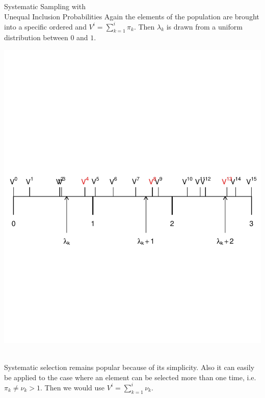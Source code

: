 \documentclass[10pt]{beamer}\usepackage[]{graphicx}\usepackage[]{color}
\newenvironment{knitrout}{}{} %
\begin{document}
\begin{frame}{Systematic Sampling with \\ Unequal Inclusion Probabilities}
Again the elements of the population are brought into a specific ordered and $V^i = \sum_{k=1}^i \pi_k$. Then $\lambda_k$ is drawn from a uniform distribution between $0$ and $1$.
~\\[-4cm]
\begin{knitrout}\footnotesize
{}\color{fgcolor}

{\centering \includegraphics[width=.95\linewidth]{graphs/beamer-UP_SYS-1} 

}



\end{knitrout}
~\\[-4cm]
Systematic selection remains popular because of its simplicity. Also it can easily be applied to the case where an element can be selected more than one time, i.e. $\pi_k \neq \nu_k > 1$. Then we would use $V^i = \sum_{k=1}^i \nu_k$.

\end{frame}
\end{document}
